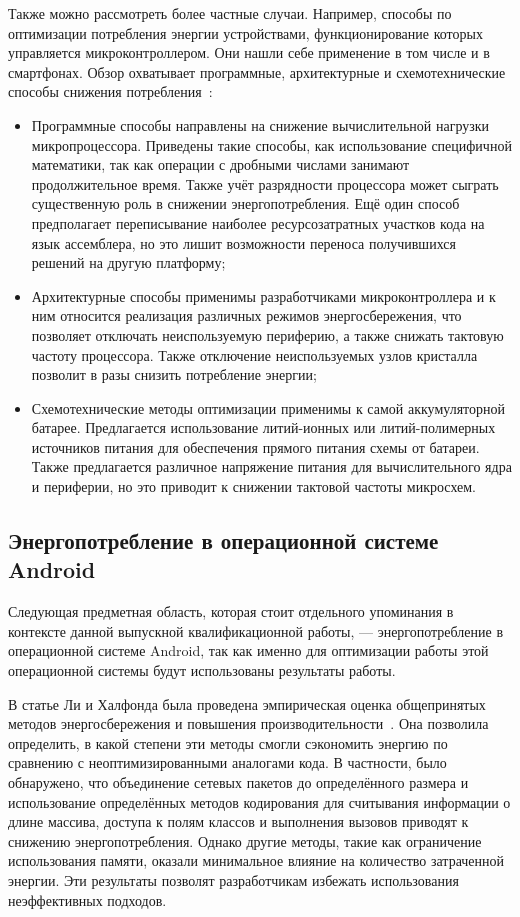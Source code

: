 \documentclass[a4paper,14pt]{extarticle} %
\begin{document}
	Также можно рассмотреть более частные случаи. Например, способы по оптимизации потребления энергии устройствами, функционирование которых управляется микроконтроллером. Они нашли себе применение в том числе и в смартфонах. Обзор охватывает программные, архитектурные и схемотехнические способы снижения потребления~\parencite{кафтанников2013оптимизация}:
	\begin{itemize}
		\item Программные способы направлены на снижение вычислительной нагрузки микропроцессора. Приведены такие способы, как использование специфичной математики, так как операции с дробными числами занимают продолжительное время. Также учёт разрядности процессора может сыграть существенную роль в снижении энергопотребления. Ещё один способ предполагает переписывание наиболее ресурсозатратных участков кода на язык ассемблера, но это лишит возможности переноса получившихся решений на другую платформу;
		\item Архитектурные способы применимы разработчиками микроконтроллера и к ним относится реализация различных режимов энергосбережения, что позволяет отключать неиспользуемую периферию, а также снижать тактовую частоту процессора. Также отключение неиспользуемых узлов кристалла позволит в разы снизить потребление энергии;
		\item Схемотехнические методы оптимизации применимы к самой аккумуляторной батарее. Предлагается использование литий-ионных или литий-полимерных источников питания для обеспечения прямого питания схемы от батареи. Также предлагается различное напряжение питания для вычислительного ядра и периферии, но это приводит к снижении тактовой частоты микросхем.
	\end{itemize}
	
	\subsection{Энергопотребление в операционной системе Android}

	Следующая предметная область, которая стоит отдельного упоминания в контексте данной выпускной квалификационной работы, --- энергопотребление в операционной системе Android, так как именно для оптимизации работы этой операционной системы будут использованы результаты работы.
	
	В статье  Ли и Халфонда была проведена эмпирическая оценка общепринятых методов энергосбережения и повышения производительности~\parencite{li2014investigation}. Она позволила определить, в какой степени эти методы смогли сэкономить энергию по сравнению с неоптимизированными аналогами кода. В частности, было обнаружено, что объединение сетевых пакетов до определённого размера и использование определённых методов кодирования для считывания информации о длине массива, доступа к полям классов и выполнения вызовов приводят к снижению энергопотребления. Однако другие методы, такие как ограничение использования памяти, оказали минимальное влияние на количество затраченной энергии. Эти результаты позволят разработчикам избежать использования неэффективных подходов.
	
\end{document}
